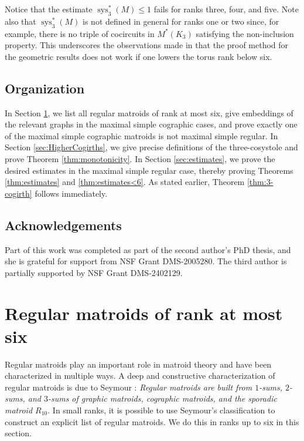 \documentclass[reqno,12pt]{amsart}
\numberwithin{theorem}{section}
\theoremstyle{plain}
\theoremstyle{definition}
\theoremstyle{remark}
\numberwithin{equation}{section}
\numberwithin{table}{section}
\DeclareMathOperator{\sys}{sys}
\begin{document}
Notice that the estimate $\sys_3^*(M) \leq 1$ fails for ranks three, four, and five. Note also that $\sys_3^*(M)$ is not defined in general for ranks one or two since, for example, there is no triple of cocircuits in $M^*(K_3)$ satisfying the non-inclusion property.  This underscores the observations made in \cite{KWW2} that the proof method for the geometric results does not work if one lowers the torus rank below six.



\subsection*{Organization}
In Section \ref{sec:list}, we list all regular matroids of rank at most six, give embeddings of the relevant graphs in the maximal simple cographic cases, and prove exactly one of the maximal simple cographic matroids is not maximal simple regular. 
In Section \ref{sec:HigherCogirths}, we give precise definitions of the three-cosystole and prove Theorem \ref{thm:monotonicity}. 
In Section \ref{sec:estimates}, we prove the desired estimates in the maximal simple regular case, thereby proving Theorems \ref{thm:estimates} and \ref{thm:estimates<6}. As stated earlier, Theorem \ref{thm:3-cogirth} follows immediately.

\subsection*{Acknowledgements}
Part of this work was completed as part of the second author's PhD thesis, and she is grateful for support from NSF Grant DMS-2005280. The third author is partially supported by NSF Grant DMS-2402129.













\vspace{1em}
\section{Regular matroids of rank at most six}
\label{sec:list}
\vspace{1em}

Regular matroids play an important role in matroid theory and have been characterized in multiple ways. A deep and constructive characterization of regular matroids is due to Seymour \cite{Seymour80}: {\it Regular matroids are built from $1$-sums, $2$-sums, and $3$-sums of graphic matroids, cographic matroids, and the sporadic matroid $R_{10}$}. In small ranks, it is possible to use Seymour's classification to construct an explicit list of regular matroids. We do this in ranks up to six in this section.
\end{document}
